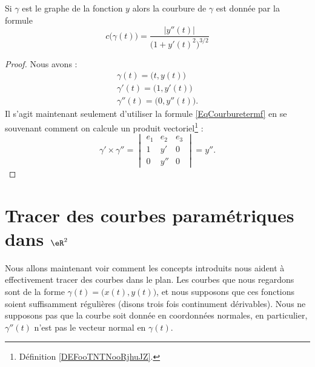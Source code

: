 \begin{lemma}
    Si \( \gamma\) est le graphe de la fonction \( y\) alors la courbure de \( \gamma\) est donnée par la formule
    \begin{equation}
        c\big( \gamma(t) \big)=\frac{ | y''(t) | }{ \big( 1+y'(t)^2 \big)^{3/2} }
    \end{equation}
\end{lemma}

\begin{proof}
    Nous avons :
    \begin{subequations}
        \begin{align}
            \gamma(t)=\big( t,y(t) \big)\\
            \gamma'(t)=\big( 1,y'(t) \big)\\
            \gamma''(t)=\big( 0,y''(t) \big).
        \end{align}
    \end{subequations}
    Il s'agit maintenant seulement d'utiliser la formule \eqref{EqCourburetermf} en se souvenant comment on calcule un produit vectoriel\footnote{Définition \ref{DEFooTNTNooRjhuJZ}.} :
    \begin{equation}
        \gamma'\times \gamma''=
        \begin{vmatrix}
            e_1&e_2&e_3\\
            1&y'&0\\
            0&y''&0
        \end{vmatrix}=y''.
    \end{equation}
\end{proof}

\section{Tracer des courbes paramétriques dans $\eR^2$}     \label{SecTracerParmCourbe}

Nous allons maintenant voir comment les concepts introduits nous aident à effectivement tracer des courbes dans le plan. Les courbes que nous regardons sont de la forme $\gamma(t)=\big( x(t),y(t) \big)$, et nous supposons que ces fonctions soient suffisamment régulières (disons trois fois continument dérivables). Nous ne supposons pas que la courbe soit donnée en coordonnées normales, en particulier, $\gamma''(t)$ n'est pas le vecteur normal en $\gamma(t)$.

